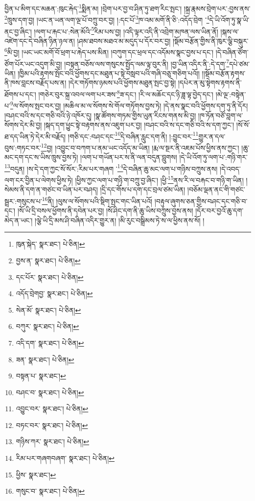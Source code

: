 བྱིན་པ་མིག་དང་མཆན་:ཁུང་རྐེད་\footnote{ཁུན་སྐེད་  སྣར་ཐང་།  པེ་ཅིན། }སྨིན་མ། །བྲེག་པར་བྱ་བ་ཤིན་ཏུ་ཐག་རིང་སྤང་། །སྐྲ་རྣམས་བྲེག་པར་:བྱས་ནས་\footnote{བྱས་ན་  སྣར་ཐང་།  པེ་ཅིན། }ཁྲུས་དག་བྱ། །ཡང་ན་ཡན་ལག་ལྔ་པོ་བཀྲུ་བར་བྱ། །:དང་པོ་\footnote{དང་པོར་  སྣར་ཐང་།  པེ་ཅིན། }ཁ་འམ་མགོ་ནི་ཅི་:འདོད་བྲེག ་\footnote{འདོད་བྲེགབྱ་  སྣར་ཐང་།  པེ་ཅིན། }དེ་ཡི་འོག་ཏུ་སྣ་ཡི་ནང་བྱ་ཞིང་། །ལག་པ་རྐང་པ་:སེན་མོའི་\footnote{སེན་མོ་  སྣར་ཐང་།  པེ་ཅིན། }རིམ་པས་བྱ། །འདི་ལྟར་འདི་ནི་འབྲེག་མཁན་ལས་ཡིན་ནོ། །སྐས་ལ་འཛེག་དང་དེ་བཞིན་ཉིན་ཉལ་ན། །ཤམ་ཐབས་མཐའ་མ་མདུད་པ་དོར་བར་བྱ། །སྡོམ་བརྩོན་གྱིས་ནི་ཁུར་ལྕི་བསྐུར་\footnote{བཀུར་  སྣར་ཐང་།  པེ་ཅིན། }མི་བྱ། །ཡང་ཡང་མགོ་བོ་ཕྲག་པ་རྐེད་པས་མིན། །བཀུག་དང་ཕྲལ་དང་འདོམས་སྣང་བྱས་པ་དང་། །དེ་བཞིན་ཙོག་ཙོག་པོར་ཡང་འདུག་མི་བྱ། །བསྟན་བཅོས་ལས་གསུངས་སྤྱོད་ལམ་ལྟ་བུར་ནི། །བྱ་ཡིན་འདིར་ནི་:དེ་དག་\footnote{འདི་དག་  སྣར་ཐང་།  པེ་ཅིན། }དཔེ་ཙམ་ཡིན། །ཁྱིམ་པའི་རྟགས་སྤོང་བའི་ཕྱོགས་དང་མཐུན་པ་སྟེ་བསླབ་པའི་གཞི་བཅུ་གཅིག་པའོ།། །།སྡོམ་བརྩོན་རྟགས་ནི་ཁས་བླངས་བརྗོད་པས་ན། །དེར་གཏོགས་ཉམས་པའི་ཕྱོགས་མཐུན་སྤང་བྱ་སྟེ། །དཔེར་ན་མུ་སྟེགས་རྟགས་ནི་ཐོགས་པ་དང་། །གཅེར་བུར་སྐྲ་འབལ་ལག་པར་ཟས་\footnote{ཟན་  སྣར་ཐང་།  པེ་ཅིན། }ཟ་དང་། །རི་ལ་མཆོང་དང་ཉི་ཟླ་ལྟ་བྱེད་དང་། །མེ་ལྔ་:བསྟེན་པ་\footnote{བསྟན་པ་  སྣར་ཐང་། }ལ་སོགས་སྤང་བར་བྱ། །མཆིལ་མ་ལ་སོགས་སེ་གོལ་གཏོགས་བྱས་ཏེ། །དེ་ནས་སྣང་བའི་ཕྱོགས་དག་ཏུ་ནི་དོར། །བཤང་བའི་ས་དང་གཅི་བའི་ཉེ་འཁོར་དུ། །སྣ་ཚོགས་གཏམ་གྱིས་ཡུན་རིངས་གནས་མི་བྱ། །ཁ་ཏོན་བཙོ་བླག་ལ་སོགས་དེར་མི་བྱ། །སྐད་དག་ཕྱུང་སྟེ་བརྟགས་ནས་འཇུག་པར་བྱ། །བཤང་བའི་ས་དང་གཅི་བའི་ས་དག་ཀྱང་། །སོ་སོ་ཐ་དད་ཡིན་ཏེ་དེར་མི་བརྗོད། །གཅི་དང་:བཤང་དང་\footnote{བཤང་བ་  སྣར་ཐང་།  པེ་ཅིན། }དེ་བཞིན་རླུང་དག་ནི། །:བྱུང་བར་\footnote{འབྱུང་བར་  སྣར་ཐང་།  པེ་ཅིན། }གྱུར་ན་དལ་བུས་:གཏང་བར་\footnote{བཏང་བར་  སྣར་ཐང་།  པེ་ཅིན། }བྱ། །འབྱུང་བ་བཀག་པ་ནམ་ཡང་འདོད་མ་ཡིན། །རྨ་ལ་སྔར་ནི་འཇམ་པོས་ཕྱིས་ནས་ཀྱང་། །ཆུ་མང་དག་དང་ས་ཡིས་ཁྲུས་བྱས་ཏེ། །ལག་པ་གཡོན་པར་ས་ནི་ལན་བདུན་བླུགས། །དེ་ཡི་འོག་ཏུ་ལག་པ་:གཉི་གར་\footnote{གཉིས་ཀར་  སྣར་ཐང་།  པེ་ཅིན། }བདུན། །ས་དེ་དག་ཀྱང་སོ་སོར་:རིམ་པར་གཞག ་\footnote{རིམ་པར་གཞགབཞག་  སྣར་ཐང་།  པེ་ཅིན། }དེ་བཞིན་ཆུ་མང་ལག་པ་གཉིས་བཀྲུས་ནས། །དེ་འབད་ལག་ངར་བྱིན་པ་ལེགས་ཕྱིས་ཏེ། །ཕྱིས་ཀྱང་ལག་པ་གཉི་ག་བཀྲུ་བྱ་ཞིང་། །ཕྱི་\footnote{ཕྱིས་  སྣར་ཐང་། }ནས་རི་ལ་བརྐང་བ་གཉི་ག་ཡིན། །སེམས་ནི་དག་ན་གཙང་བ་ཡིན་པར་བཤད། །དྲི་དང་གོས་པ་དག་དང་བྲལ་ཙམ་ཡིན། །བཅོམ་ལྡན་ནང་གི་གཙང་སྦྲར་:གསུངས་པ་\footnote{གསུང་བ་  སྣར་ཐང་།  པེ་ཅིན། }ནི། །ལུས་ལ་སོགས་པའི་སྡིག་སྤང་གང་ཡིན་པའོ། །བརྟུལ་ཞུགས་ཅན་གྱིས་བཤང་དང་གཅི་བ་དང་། །སོ་ཡི་དྲི་བསལ་ཕྱོགས་ནི་དབེན་པར་བྱ། །སོ་ཤིང་དག་ནི་ཆུ་ཡིས་བཀྲུས་བྱས་ནས། །དོར་བར་བྱའོ་ཆུ་དག་མེད་ན་ཡང་། །ལྕེ་ཡི་དྲི་མས་ཤི་བཞིན་འདིར་གྱུར་ན། །མི་རུང་བསྒྲིམས་ཏེ་ས་ལ་ཕྱིས་ནས་སོ། །
